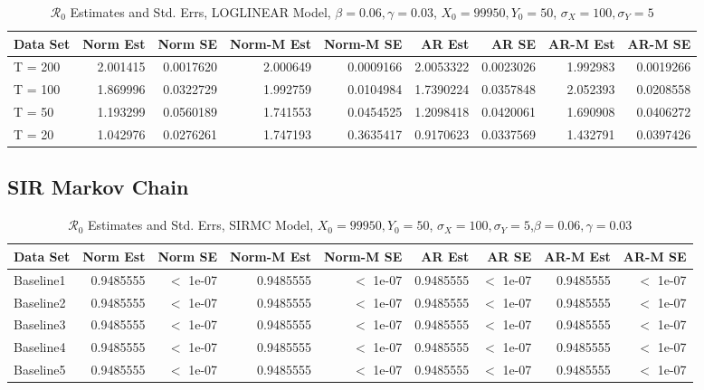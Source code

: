 \documentclass[12pt]{article}
\newcommand{\rr}{\ensuremath{\mathcal{R}_0}}
\begin{document}
\begin{table}[H]
	
	\caption{\label{tab:}$\rr$ Estimates and Std. Errs, LOGLINEAR Model,
		$\beta = 0.06, \gamma = 0.03$, $X_0 = 99950, Y_0 = 50$, $\sigma_X = 100, \sigma_Y = 5$}
	\centering
	\begin{tabular}[t]{l|r|r|r|r|r|r|r|r}
		\hline
		Data Set & Norm Est & Norm SE & Norm-M Est & Norm-M SE & AR Est & AR SE & AR-M Est & AR-M SE\\
		\hline
		T = 200 & 2.001415 & 0.0017620 & 2.000649 & 0.0009166 & 2.0053322 & 0.0023026 & 1.992983 & 0.0019266\\
		\hline
		T = 100 & 1.869996 & 0.0322729 & 1.992759 & 0.0104984 & 1.7390224 & 0.0357848 & 2.052393 & 0.0208558\\
		\hline
		T = 50 & 1.193299 & 0.0560189 & 1.741553 & 0.0454525 & 1.2098418 & 0.0420061 & 1.690908 & 0.0406272\\
		\hline
		T = 20 & 1.042976 & 0.0276261 & 1.747193 & 0.3635417 & 0.9170623 & 0.0337569 & 1.432791 & 0.0397426\\
		\hline
	\end{tabular}
\end{table}

\subsection{SIR Markov Chain}

\begin{table}[H]
	
	\caption{\label{tab:}$\rr$ Estimates and Std. Errs, SIRMC Model,
		$X_0 = 99950, Y_0 = 50$, $\sigma_X = 100, \sigma_Y = 5$,$\beta = 0.06, \gamma = 0.03$}
	\centering
	\begin{footnotesize}
		\begin{tabular}[t]{l|r|r|r|r|r|r|r|r}
			\hline
			Data Set & Norm Est & Norm SE & Norm-M Est & Norm-M SE & AR Est & AR SE & AR-M Est & AR-M SE\\
			\hline
			Baseline1 & 0.9485555 & $<$ 1e-07 & 0.9485555 & $<$ 1e-07 & 0.9485555 & $<$ 1e-07 & 0.9485555 & $<$ 1e-07\\
			\hline
			Baseline2 & 0.9485555 & $<$ 1e-07 & 0.9485555 & $<$ 1e-07 & 0.9485555 & $<$ 1e-07 & 0.9485555 & $<$ 1e-07\\
			\hline
			Baseline3 & 0.9485555 & $<$ 1e-07 & 0.9485555 & $<$ 1e-07 & 0.9485555 & $<$ 1e-07 & 0.9485555 & $<$ 1e-07\\
			\hline
			Baseline4 & 0.9485555 & $<$ 1e-07 & 0.9485555 & $<$ 1e-07 & 0.9485555 & $<$ 1e-07 & 0.9485555 & $<$ 1e-07\\
			\hline
			Baseline5 & 0.9485555 & $<$ 1e-07 & 0.9485555 & $<$ 1e-07 & 0.9485555 & $<$ 1e-07 & 0.9485555 & $<$ 1e-07\\
			\hline
		\end{tabular}
	\end{footnotesize}
\end{table}
\end{document}
